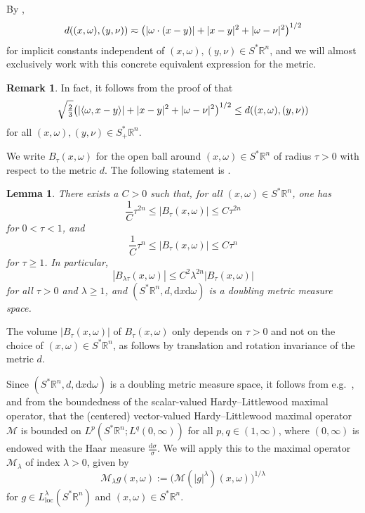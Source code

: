 \documentclass{amsart}
\newcommand {\ud}{\mathrm{d}}
\newcommand {\Hp}{\mathcal{H}^{p}_{FIO}(\Rn)}
\newcommand {\la}{\lambda}
\newcommand {\loc}{\mathrm{loc}}
\newcommand {\Ma}{\mathcal{M}}
\newcommand {\Rn}{\mathbb{R}^{n}}
\newcommand {\Sp}{S^{*}\Rn}
\newcommand {\Spp}{S^{*}_{+}\Rn}
\newcommand {\w}{\omega}
\newtheorem{lemma}[theorem]{Lemma}
\theoremstyle{definition}
\newtheorem{remark}[theorem]{Remark}
\numberwithin{equation}{section}
\begin{document}
By \cite[Lemma 2.1]{HaPoRo20}, %
\begin{equation}\label{eq:equivmetric}
d((x,\omega),(y,\nu))\eqsim \big{(}|\omega\cdot(x-y)|+|x-y|^{2}+|\omega-\nu|^{2}\big{)}^{1/2}
\end{equation}
for implicit constants independent of $(x,\w),(y,\nu)\in\Sp$, and we will almost exclusively work with this concrete equivalent expression for the metric.

\begin{remark}\label{rem:constantmetric}
In fact, it follows from the proof of \cite[Lemma 2.1]{HaPoRo20} that 
\[
\sqrt{\tfrac{2}{3}}\big{(}|\langle\omega,x-y\rangle|+|x-y|^{2}+|\omega-\nu|^{2}\big{)}^{1/2}\leq d((x,\omega),(y,\nu))
\]
for all $(x,\w),(y,\nu)\in\Spp$. %
\end{remark}

We write $B_{\tau}(x,\w)$ for the open ball around $(x,\w)\in\Sp$ of radius $\tau>0$ with respect to the metric $d$. The following statement is \cite[Lemma 2.3]{HaPoRo20}. 




\begin{lemma}\label{lem:doubling}
There exists a $C>0$ such that, for all $(x,\omega)\in \Sp$, one has
\[
\frac{1}{C}\tau^{2n}\leq |B_{\tau}(x,\omega)|\leq C\tau^{2n}
\]
for $0<\tau<1$, and
\[
\frac{1}{C}\tau^{n}\leq |B_{\tau}(x,\omega)|\leq C\tau^{n}
\]
for $\tau\geq 1$. In particular,
\[
|B_{\lambda \tau}(x,\omega)|\leq C^{2}\lambda^{2n}|B_{\tau}(x,\omega)|
\]
for all $\tau>0$ and $\lambda \geq 1$, and $(\Sp,d,\ud x\ud\omega)$ is a doubling metric measure space.
\end{lemma}

The volume $|B_{\tau}(x,\w)|$ of %
$B_{\tau}(x,\w)$ only depends on $\tau>0$ and not on the choice of $(x,\w)\in\Sp$, as follows by translation and rotation invariance of the metric $d$.

Since $(\Sp,d,\ud x\ud\w)$ is a doubling metric measure space, it follows from e.g.~\cite[Theorem 1.5]{Tozoni04}, and from the boundedness of the scalar-valued Hardy--Littlewood maximal operator, that the (centered) {vector-valued} Hardy--Littlewood maximal operator $\Ma$ is bounded on $L^{p}(\Sp;L^{q}(0,\infty))$ for all $p,q\in(1,\infty)$, where $(0,\infty)$ is endowed with the Haar measure $\frac{\ud\sigma}{\sigma}$. We will apply this to the maximal operator $\Ma_{\la}$ of index $\lambda>0$, given by 
\begin{equation}\label{eq:maxHL}
\mathcal{M}_{\lambda}g(x,\omega):=\big(\Ma(|g|^\lambda)(x,\omega)\big)^{1/{\lambda}}
\end{equation}
for $g\in L^{\lambda}_{\loc}(\Sp)$ and $(x,\w)\in\Sp$. 
\end{document}
